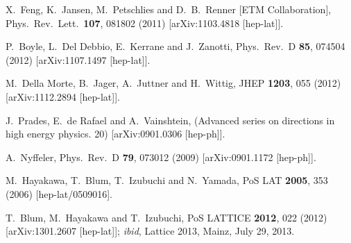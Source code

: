 \begin{thebibliography}{99}
  X.~Feng, K.~Jansen, M.~Petschlies and D.~B.~Renner [ETM Collaboration],
  Phys.\ Rev.\ Lett.\  {\bf 107}, 081802 (2011)
  [arXiv:1103.4818 [hep-lat]].

  P.~Boyle, L.~Del Debbio, E.~Kerrane and J.~Zanotti,
  Phys.\ Rev.\ D {\bf 85}, 074504 (2012)
  [arXiv:1107.1497 [hep-lat]].

  M.~Della Morte, B.~Jager, A.~Juttner and H.~Wittig,
  JHEP {\bf 1203}, 055 (2012)
  [arXiv:1112.2894 [hep-lat]].

  J.~Prades, E.~de Rafael and A.~Vainshtein,
  (Advanced series on directions in high energy physics. 20)
  [arXiv:0901.0306 [hep-ph]].

  A.~Nyffeler,
  Phys.\ Rev.\ D {\bf 79}, 073012 (2009)
  [arXiv:0901.1172 [hep-ph]].

  M.~Hayakawa, T.~Blum, T.~Izubuchi and N.~Yamada,
  PoS LAT {\bf 2005}, 353 (2006)
  [hep-lat/0509016].

  T.~Blum, M.~Hayakawa and T.~Izubuchi,
  PoS LATTICE {\bf 2012}, 022 (2012)
  [arXiv:1301.2607 [hep-lat]]; {\it ibid}, Lattice 2013, Mainz, July 29, 2013.


\end{thebibliography}
